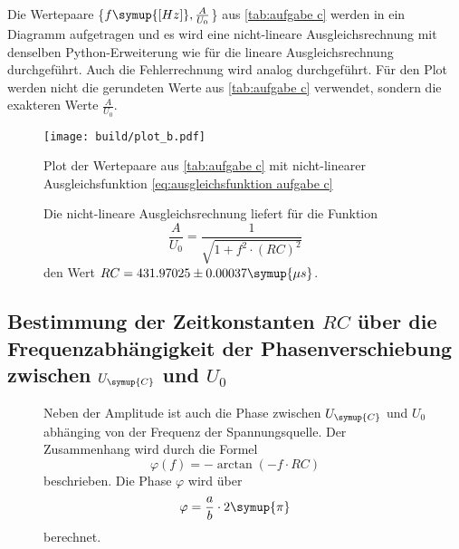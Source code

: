 Die Wertepaare \{$f \symup{[Hz]}, \frac{A}{U_{0}}$\} aus \autoref{tab:aufgabe c} werden in ein Diagramm aufgetragen
und es wird eine nicht-lineare Ausgleichsrechnung mit denselben Python-Erweiterung wie für die lineare Ausgleichsrechnung
durchgeführt. Auch die Fehlerrechnung wird analog durchgeführt. Für den Plot werden nicht die
gerundeten Werte aus \autoref{tab:aufgabe c} verwendet, sondern die exakteren Werte $\frac{A}{U_{0}}$.

\begin{figure}
  \centering
  \texttt{[image: build/plot\_b.pdf]}
  \caption{Plot der Wertepaare aus \autoref{tab:aufgabe c} mit nicht-linearer Ausgleichsfunktion \autoref{eq:ausgleichsfunktion aufgabe c}}
  \label{fig:plot_b}
\end{figure}

\begin{figure}[H]
Die nicht-lineare Ausgleichsrechnung liefert für die Funktion 
  \begin{equation}
    \frac{A}{U_{0}} = \frac{1}{\sqrt{1+f^2\cdot (RC)^2}}
    \label{eq:ausgleichsfunktion aufgabe c}
  \end{equation}
den Wert $RC = 431.97025\pm0.00037\symup{\mu s}$.
\end{figure}



\subsection{Bestimmung der Zeitkonstanten $RC$ über die Frequenzabhängigkeit der Phasenverschiebung%
 zwischen $U_{\symup{C}}$ und $U_{0}$}
 \begin{figure}[H]
  Neben der Amplitude ist auch die Phase zwischen $U_{\symup{C}}$ und $U_{0}$ abhänging von der Frequenz der Spannungsquelle.
  Der Zusammenhang wird durch die Formel
  \begin{equation}
    \varphi(f) = -\arctan(-f\cdot RC)
    \label{eq:Formel für Phasenverschiebung}
  \end{equation}
  beschrieben. 
 Die Phase $\varphi$ wird über
 \begin{equation}
   \varphi = \frac{a}{b}\cdot 2\symup{\pi}
 \end{equation}
 berechnet.
 \end{figure}
 

